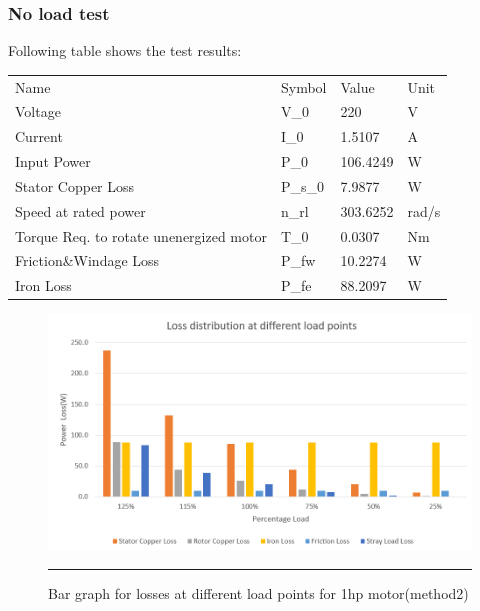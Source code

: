 \subsubsection{No load test}
Following table shows the test results:
\begin{table}[hbtp!]
\begin{tabular}{llll}
    \rowcolor[HTML]{656565} 
    Name                                                              & Symbol  & Value    & Unit  \\
    \cellcolor[HTML]{656565}Voltage                                 & V\_0    & 220      & V       \\
    \rowcolor[HTML]{F2F2F2} 
    \cellcolor[HTML]{656565}Current                                 & I\_0    & 1.5107   & A       \\
    \cellcolor[HTML]{656565}Input Power                             & P\_0    & 106.4249 & W       \\
    \rowcolor[HTML]{F2F2F2} 
    \cellcolor[HTML]{656565}Stator Copper Loss                      & P\_s\_0 & 7.9877   & W       \\
    \cellcolor[HTML]{656565}Speed at rated power                    & n\_rl   & 303.6252 & rad/s   \\
    \rowcolor[HTML]{F2F2F2} 
    \cellcolor[HTML]{656565}Torque Req. to rotate unenergized motor & T\_0    & 0.0307   & Nm      \\
    \cellcolor[HTML]{656565}Friction\&Windage Loss                  & P\_fw   & 10.2274  & W       \\
    \rowcolor[HTML]{F2F2F2} 
    \cellcolor[HTML]{656565}Iron Loss                               & P\_fe   & 88.2097  & W      
\end{tabular}
\end{table}

\begin{figure}[hbtp!]
	\centering
		\includegraphics[width = 4.5in]{./Figures/MS/fig58.png}
		\rule{35em}{0.5pt}
	\caption{Bar graph for losses at different load points for 1hp motor(method2)}
	\label{fig:Bar graph for losses at different load points for 1hp motor(method2)} 
\end{figure}

